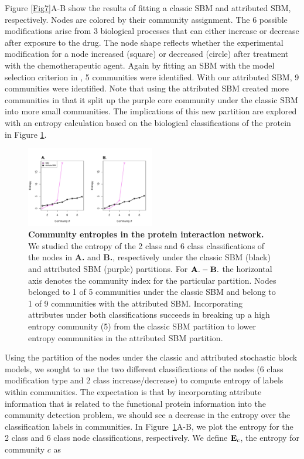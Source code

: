 \documentclass[10pt,journal,compsoc]{IEEEtran}
\begin{document}
Figure \ref{Fig7}A-B show the results of fitting a classic SBM and attributed SBM, respectively. Nodes are colored by their community assignment. The 6 possible modifications arise from 3 biological processes that can either increase or decrease after exposure to the drug. The node shape reflects whether the experimental modification for a node increased (square) or decreased (circle) after treatment with the chemotherapeutic agent. Again by fitting an SBM with the model selection criterion in \cite{dudin}, 5 communities were identified. With our attributed SBM, 9 communities were identified. Note that using the attributed SBM created more communities in that it split up the purple core community under the classic SBM into more small communities. The implications of this new partition are explored with an entropy calculation based on the biological classifications of the protein in Figure \ref{entropyFig}.
 \begin{figure}[h!]
\begin{center}
\includegraphics[width=0.5\textwidth]{EntropyCalc_6Classleft_2classright.pdf}
\caption{{\bf Community entropies in the protein interaction network.} We studied the entropy of the 2 class and 6 class classifications of the nodes in {\bf A.} and {\bf B.}, respectively under the classic SBM (black) and attributed SBM (purple) partitions. For ${\bf A.-B.}$ the horizontal axis denotes the community index for the particular partition. Nodes belonged to 1 of 5 communities under the classic SBM and belong to 1 of 9 communities with the attributed SBM. Incorporating attributes under both classifications succeeds in breaking up a high entropy community (5) from the classic SBM partition to lower entropy communities in the attributed SBM partition. }
\label{entropyFig} %
\end{center}
\end{figure}

Using the partition of the nodes under the classic and attributed stochastic block models, we sought to use the two different classifications of the nodes (6 class modification type and 2 class increase/decrease) to compute entropy of labels within communities. The expectation is that by incorporating attribute information that is related to the functional protein information into the community detection problem, we should see a decrease in the entropy over the classification labels in communities. In Figure~\ref{entropyFig}A-B, we plot the entropy for the 2 class and 6 class node classifications, respectively. We define ${\bf E}_{c}$, the entropy for community $c$ as
\end{document}
